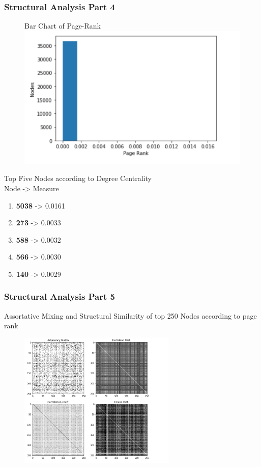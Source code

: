 \documentclass{beamer}
\begin{document}
\begin{frame}
\frametitle{Structural Analysis Part 4}
	\begin{multicols}{2}
		\begin{figure}
	        {\tiny Bar Chart of Page-Rank}
		\includegraphics[width=\columnwidth]{page-rank.png}
		\end{figure}
		\columnbreak
		{\tiny Top Five Nodes according to Degree Centrality} \\
		Node  ->  Measure
		\begin{enumerate} 
		\item \textbf{5038} -> 0.0161
		\item \textbf{273} -> 0.0033
		\item \textbf{588} -> 0.0032
		\item \textbf{566} -> 0.0030
		\item \textbf{140} -> 0.0029
		\end{enumerate} 
	\end{multicols}
\end{frame}

\begin{frame}
\frametitle{Structural Analysis Part 5}
	\begin{center}
	 	{\tiny Assortative Mixing and Structural Similarity of top 250 Nodes according to page rank}
	\end{center}
	 \begin{figure}
		\includegraphics[width=75mm]{adj.png}
	\end{figure}
\end{frame}
\end{document}
